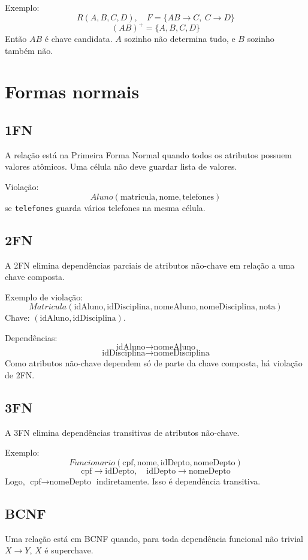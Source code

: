 \documentclass[12pt,a4paper]{article}
\begin{document}
Exemplo:
\[
R(A,B,C,D),\quad F=\{AB\rightarrow C,\ C\rightarrow D\}
\]
\[
(AB)^+ = \{A,B,C,D\}
\]
Então $AB$ é chave candidata. $A$ sozinho não determina tudo, e $B$ sozinho também não.

\section{Formas normais}
\subsection{1FN}
A relação está na Primeira Forma Normal quando todos os atributos possuem valores atômicos. Uma célula não deve guardar lista de valores.

Violação:
\[
Aluno(\text{matricula}, \text{nome}, \text{telefones})
\]
se \texttt{telefones} guarda vários telefones na mesma célula.

\subsection{2FN}
A 2FN elimina dependências parciais de atributos não-chave em relação a uma chave composta.

Exemplo de violação:
\[
Matricula(\text{idAluno},\text{idDisciplina},\text{nomeAluno},\text{nomeDisciplina},\text{nota})
\]
Chave: $(\text{idAluno},\text{idDisciplina})$.

Dependências:
\[
\text{idAluno} \rightarrow \text{nomeAluno}
\]
\[
\text{idDisciplina} \rightarrow \text{nomeDisciplina}
\]
Como atributos não-chave dependem só de parte da chave composta, há violação de 2FN.

\subsection{3FN}
A 3FN elimina dependências transitivas de atributos não-chave.

Exemplo:
\[
Funcionario(\text{cpf},\text{nome},\text{idDepto},\text{nomeDepto})
\]
\[
\text{cpf} \rightarrow \text{idDepto},\quad \text{idDepto} \rightarrow \text{nomeDepto}
\]
Logo, $\text{cpf} \rightarrow \text{nomeDepto}$ indiretamente. Isso é dependência transitiva.

\subsection{BCNF}
Uma relação está em BCNF quando, para toda dependência funcional não trivial $X \rightarrow Y$, $X$ é superchave.
\end{document}
